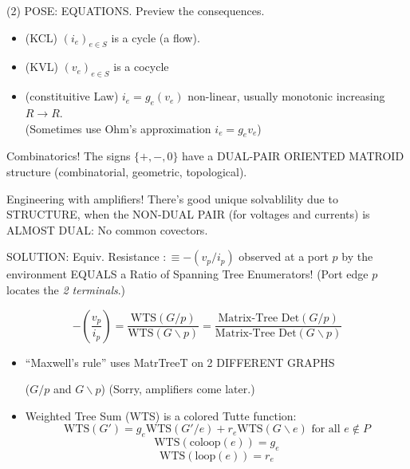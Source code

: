 \documentclass{beamer}
\newcommand{\Remph}[1]{{\color{red}#1}}
\begin{document}
\begin{frame}{(2) POSE: EQUATIONS.  \Remph{Preview the consequences.}}
\begin{itemize}
\item 
(KCL) $(i_e)_{e\in S}$ is a cycle (a flow).
\item
(KVL) $(v_e)_{e\in S}$ is a cocycle
\item
(constituitive Law) $i_e=g_e(v_e)$
non-linear, usually monotonic increasing $R\rightarrow R$.\\ 
(Sometimes use Ohm's approximation $i_e=g_ev_e$)
\end{itemize}
\begin{block}{Combinatorics!}
The signs $\{ +, -, 0\}$ have a \Remph{DUAL-PAIR ORIENTED MATROID} structure
(combinatorial, geometric, topological).
\end{block}
\begin{block}{Engineering with amplifiers!}
There's good unique solvablility due to STRUCTURE,
when the \Remph{NON-DUAL PAIR} (for voltages and currents)
is ALMOST DUAL: No common covectors.
\end{block}
\end{frame}



\begin{frame}{SOLUTION: Equiv. Resistance $ :\equiv -(v_p/i_p)$
observed at a port $p$ by the environment
EQUALS a Ratio of Spanning Tree Enumerators!
(Port edge $p$ locates the \textit{2 terminals}.)}

\[
-(\frac{v_p}{i_p})=\frac{\mbox{WTS}(G/p)}
{\mbox{WTS}(G\backslash p)} 
= \frac{\mbox{Matrix-Tree Det}(G/p)}
       {\mbox{Matrix-Tree Det}(G\backslash p)}
\]
\begin{itemize}
\item
``Maxwell's rule'' uses MatrTreeT on 2 DIFFERENT GRAPHS\\
\begin{center}($G/p$ and $G\backslash p$) (Sorry, amplifiers come later.) \end{center}
\item
Weighted Tree Sum (WTS) is a colored Tutte function:
\[
\mbox{WTS}(G') =
g_e \mbox{WTS}(G'/e) + r_e \mbox{WTS} (G \backslash e)
\text{\ for all\ }e \not\in P
\]
\[
\mbox{WTS}(\text{coloop}(e)) = g_e
\]
\[
\mbox{WTS}(\text{loop}(e)) = r_e
\]
\end{itemize}
\end{frame}
\end{document}
